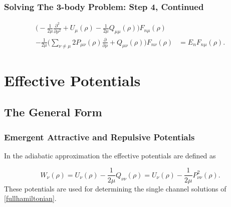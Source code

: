 \documentclass[hideothersubsections]{beamer}
\begin{document}
\begin{frame}
\frametitle{Solving The 3-body Problem: Step 4, Continued}
\begin{align}\label{fullhamiltonian}
\bigg(-\frac{1}{2 \mu}\frac{\partial^2}{ \partial \rho^2} + U_{\mu}(\rho) - \frac{1}{2\mu}Q_{\mu\mu}(\rho) \bigg)F_{n\mu}(\rho)&\nonumber\\ -\frac{1}{2\mu}\bigg(\sum_{\nu\neq\mu}2P_{\mu\nu}(\rho)\frac{\partial}{\partial\rho} + Q_{\mu\nu}(\rho) \bigg)F_{n\nu}(\rho)& = E_nF_{n\mu}(\rho).
\end{align}
\end{frame}

\section{Effective Potentials}
\subsection{The General Form}
\begin{frame}
\frametitle{Emergent Attractive and Repulsive Potentials}
In the adiabatic approximation the effective potentials are defined as 

\begin{equation}
W_{\nu}(\rho) = U_{\nu}(\rho)-\frac{1}{2\mu}Q_{\nu \nu}(\rho) = U_{\nu}(\rho)-\frac{1}{2\mu}P_{\nu \nu}^2(\rho).
\end{equation} 
These potentials are used for determining the single channel solutions of \eqref{fullhamiltonian}. 
\end{frame}

\end{document}
